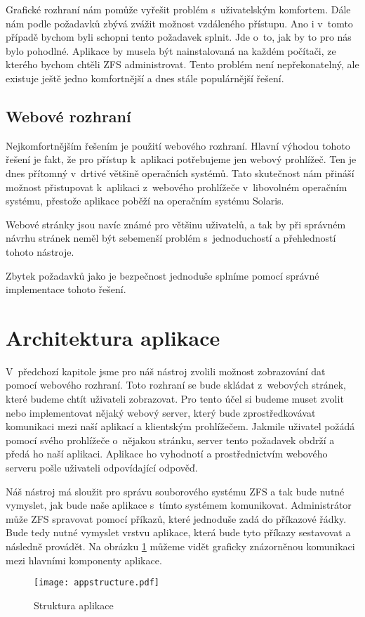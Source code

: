     Grafické rozhraní nám pomůže vyřešit problém s~uživatelským komfortem. Dále nám podle požadavků zbývá zvážit možnost vzdáleného přístupu. Ano i v~tomto případě bychom byli schopni tento požadavek splnit. Jde o~to, jak by to pro nás bylo pohodlné. Aplikace by musela být nainstalovaná na každém počítači, ze kterého bychom chtěli ZFS administrovat. Tento problém není nepřekonatelný, ale existuje ještě jedno komfortnější a dnes stále populárnější řešení.
    \subsection{Webové rozhraní}
    Nejkomfortnějším řešením je použití webového rozhraní. Hlavní výhodou tohoto řešení je fakt, že pro přístup k~aplikaci potřebujeme jen webový prohlížeč. Ten je dnes přítomný v~drtivé většině operačních systémů. Tato skutečnost nám přináší možnost přistupovat k~aplikaci z~webového prohlížeče v~libovolném operačním systému, přestože aplikace poběží na operačním systému Solaris.

    Webové stránky jsou navíc známé pro většinu uživatelů, a tak by při správném návrhu stránek neměl být sebemenší problém s~jednoduchostí a přehledností tohoto nástroje.

    Zbytek požadavků jako je bezpečnost jednoduše splníme pomocí správné implementace tohoto řešení.
\section{Architektura aplikace}
V~předchozí kapitole jsme pro náš nástroj zvolili možnost zobrazování dat pomocí webového rozhraní. Toto rozhraní se bude skládat z~webových stránek, které budeme chtít uživateli zobrazovat. Pro tento účel si budeme muset zvolit nebo implementovat nějaký webový server, který bude zprostředkovávat komunikaci mezi naší aplikací a klientským prohlížečem. Jakmile uživatel požádá pomocí svého prohlížeče o~nějakou stránku, server tento požadavek obdrží a předá ho naší aplikaci. Aplikace ho vyhodnotí a prostřednictvím webového serveru pošle uživateli odpovídající odpověď.

Náš nástroj má sloužit pro správu souborového systému ZFS a tak bude nutné vymyslet, jak bude naše aplikace s~tímto systémem komunikovat. Administrátor může ZFS spravovat pomocí příkazů, které jednoduše zadá do příkazové řádky. Bude tedy nutné vymyslet vrstvu aplikace, která bude tyto příkazy sestavovat a následně provádět. Na obrázku \ref{architecture} můžeme vidět graficky znázorněnou komunikaci mezi hlavními komponenty aplikace.
\begin{figure}[h]
        \centering
        \texttt{[image: appstructure.pdf]}
        \caption{Struktura aplikace}
        \label{architecture}
\end{figure}
